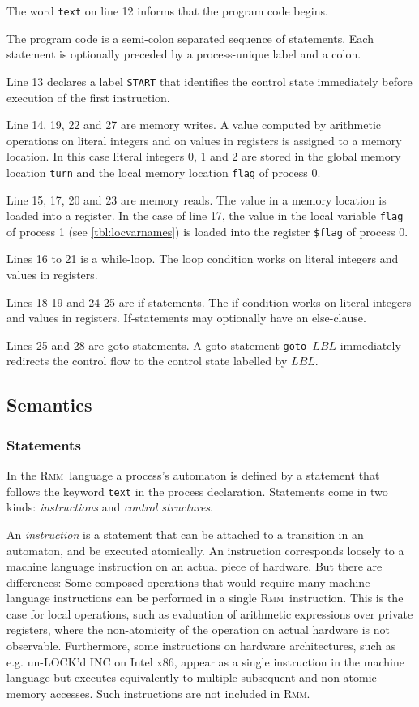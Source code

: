 \documentclass[a4paper]{article}
\newcommand{\rmm}{\textsc{Rmm}}
\begin{document}
The word \verb+text+ on line 12 informs that the program code begins.

The program code is a semi-colon separated sequence of
statements. Each statement is optionally preceded by a process-unique
label and a colon.

Line 13 declares a label \verb+START+ that identifies the control
state immediately before execution of the first instruction.

Line 14, 19, 22 and 27 are memory writes. A value computed by
arithmetic operations on literal integers and on values in registers
is assigned to a memory location. In this case literal integers 0, 1
and 2 are stored in the global memory location \verb+turn+ and the
local memory location \verb+flag+ of process 0.

Line 15, 17, 20 and 23 are memory reads. The value in a memory
location is loaded into a register. In the case of line 17, the value
in the local variable \verb+flag+ of process 1 (see
\cref{tbl:locvarnames}) is loaded into the register \verb+$flag+ of
process 0.

Lines 16 to 21 is a while-loop. The loop condition works on literal
integers and values in registers.

Lines 18-19 and 24-25 are if-statements. The if-condition works on
literal integers and values in registers. If-statements may optionally
have an else-clause.

Lines 25 and 28 are goto-statements. A goto-statement \verb+goto +$LBL$
immediately redirects the control flow to the control state labelled
by $LBL$.

\subsection{Semantics}\label{sec:semantics}
\subsubsection{Statements}

In the \rmm\ language a process's automaton is defined by a statement
that follows the keyword \verb+text+ in the process
declaration. Statements come in two kinds: \emph{instructions} and
\emph{control structures}.

An \emph{instruction} is a statement that can be attached to a
transition in an automaton, and be executed atomically. An instruction
corresponds loosely to a machine language instruction on an actual
piece of hardware. But there are differences: Some composed operations
that would require many machine language instructions can be performed
in a single \rmm\ instruction. This is the case for local operations,
such as evaluation of arithmetic expressions over private registers,
where the non-atomicity of the operation on actual hardware is not
observable. Furthermore, some instructions on hardware architectures,
such as e.g. un-LOCK'd INC on Intel x86, appear as a single
instruction in the machine language but executes equivalently to
multiple subsequent and non-atomic memory accesses. Such instructions
are not included in \rmm.
\end{document}
